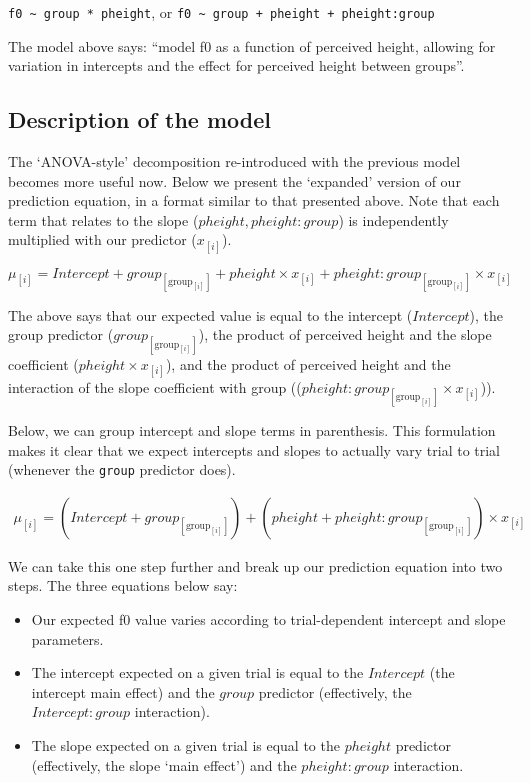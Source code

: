 \documentclass[
]{book}
\begin{document}
\texttt{f0\ \textasciitilde{}\ group\ *\ pheight}, or \texttt{f0\ \textasciitilde{}\ group\ +\ pheight\ +\ pheight:group}

The model above says: ``model f0 as a function of perceived height, allowing for variation in intercepts and the effect for perceived height between groups''.

\hypertarget{description-of-the-model-6}{%
\subsection{Description of the model}\label{description-of-the-model-6}}

The `ANOVA-style' decomposition re-introduced with the previous model becomes more useful now. Below we present the `expanded' version of our prediction equation, in a format similar to that presented above. Note that each term that relates to the slope (\(pheight, pheight \colon group\)) is independently multiplied with our predictor (\(x_{[i]}\)).

\[
\mu_{[i]} = Intercept + group_{[\mathrm{group}_{[i]}]} + pheight \times x_{[i]} + pheight \colon group_{[\mathrm{group}_{[i]}]} \times x_{[i]}
\label{eq:512}
\]

The above says that our expected value is equal to the intercept (\(Intercept\)), the group predictor (\(group_{[\mathrm{group}_{[i]}]}\)), the product of perceived height and the slope coefficient (\(pheight \times x_{[i]}\)), and the product of perceived height and the interaction of the slope coefficient with group ((\(pheight \colon group_{[\mathrm{group}_{[i]}]} \times x_{[i]}\))).

Below, we can group intercept and slope terms in parenthesis. This formulation makes it clear that we expect intercepts and slopes to actually vary trial to trial (whenever the \texttt{group} predictor does).

\begin{equation}
\begin{split}
\mu_{[i]} = (Intercept + group_{[\mathrm{group}_{[i]}]}) + (pheight + pheight \colon group_{[\mathrm{group}_{[i]}]}) \times x_{[i]}
\end{split}
\label{eq:513}
\end{equation}

We can take this one step further and break up our prediction equation into two steps. The three equations below say:

\begin{itemize}
\item
  Our expected f0 value varies according to trial-dependent intercept and slope parameters.
\item
  The intercept expected on a given trial is equal to the \(Intercept\) (the intercept main effect) and the \(group\) predictor (effectively, the \(Intercept:group\) interaction).
\item
  The slope expected on a given trial is equal to the \(pheight\) predictor (effectively, the slope `main effect') and the \(pheight:group\) interaction.
\end{itemize}
\end{document}
